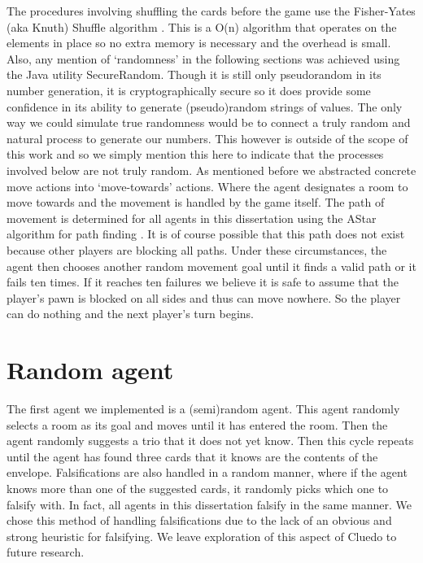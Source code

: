 \documentclass[msc, deptreport, ai, romanprepages]{infthesis}
\begin{document}
The procedures involving shuffling the cards before the game use the Fisher-Yates (aka Knuth) Shuffle algorithm \cite{shuffle}. This is a O(n) algorithm that operates on the elements in place so no extra memory is necessary and the overhead is small. Also, any mention of `randomness' in the following sections was achieved using the Java utility SecureRandom. Though it is still only pseudorandom in its number generation, it is cryptographically secure so it does provide some confidence in its ability to generate (pseudo)random strings of values. The only way we could simulate true randomness would be to connect a truly random and natural process to generate our numbers. This however is outside of the scope of this work and so we simply mention this here to indicate that the processes involved below are not truly random.
As mentioned before we abstracted concrete move actions into `move-towards' actions. Where the agent designates a room to move towards and the movement is handled by the game itself. The path of movement is determined for all agents in this dissertation using the AStar algorithm for path finding \cite{Russell-norvig}. It is of course possible that this path does not exist because other players are blocking all paths. Under these circumstances, the agent then chooses another random movement goal until it finds a valid path or it fails ten times. If it reaches ten failures we believe it is safe to assume that the player’s pawn is blocked on all sides and thus can move nowhere. So the player can do nothing and the next player’s turn begins.

\section{Random agent}
The first agent we implemented is a (semi)random agent. This agent randomly selects a room as its goal and moves until it has entered the room. Then the agent randomly suggests a trio that it does not yet know. Then this cycle repeats until the agent has found three cards that it knows are the contents of the envelope. Falsifications are also handled in a random manner, where if the agent knows more than one of the suggested cards, it randomly picks which one to falsify with. In fact, all agents in this dissertation falsify in the same manner. We chose this method of handling falsifications due to the lack of an obvious and strong heuristic for falsifying. We leave exploration of this aspect of Cluedo to future research.
\end{document}
